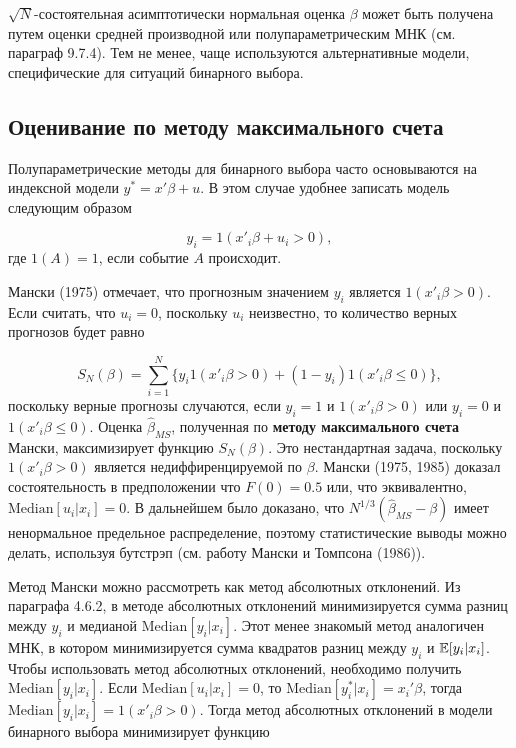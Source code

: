 $\sqrt{N}$-состоятельная асимптотически нормальная оценка $\beta$ может быть получена путем оценки средней производной  или полупараметрическим МНК (см. параграф 9.7.4). Тем не менее,  чаще используются альтернативные модели,  специфические для ситуаций бинарного выбора.

\subsection{Оценивание по методу максимального счета}

Полупараметрические методы для бинарного выбора часто основываются на индексной модели $y^*=x'\beta + u$. В этом случае удобнее записать модель следующим образом 

\[
y_i = 1(x'_i\beta + u_i > 0), 
\] 
где $1(A)=1$,  если событие $A$ происходит.

Мански  (1975)  отмечает,  что прогнозным значением $y_i$ является $1(x'_i\beta >0)$. Если считать, что $u_i=0$,  поскольку $u_i$ неизвестно,  то количество  верных прогнозов будет равно

\begin{equation} 
\label{GrindEQ__14_29_} 
S_N(\beta)=\sum^N_{i=1} \{y_i 1(x'_i\beta > 0) + (1-y_i) 1(x'_i\beta \le 0)\},  
\end{equation} 
поскольку верные прогнозы случаются, если $y_i=1$ и $1(x'_i\beta >0)$ или $y_i=0$ и $1(x'_i\beta \le 0).$ Оценка $\widehat\beta_{MS}$, полученная по \textbf{методу максимального счета} Мански,  максимизирует функцию $S_N(\beta)$. Это нестандартная задача,  поскольку $1(x'_i\beta > 0)$ является недиффиренцируемой по $\beta.$ Мански (1975,  1985) доказал состоятельность в предположении что $F(0) = 0.5$ или,  что эквивалентно,  $\mathrm{Median}[u_i|x_i]=0.$ В дальнейшем было доказано,  что $N^{1/3}(\widehat\beta_{MS} - \beta)$ имеет ненормальное предельное распределение,  поэтому статистические выводы можно делать,  используя бутстрэп (см. работу Мански и Томпсона (1986)).

Метод Мански можно рассмотреть как метод абсолютных отклонений. Из параграфа 4.6.2,  в методе абсолютных отклонений минимизируется сумма разниц между $y_i$ и медианой $\mathrm{Median}[y_i|x_i]$. Этот менее знакомый метод аналогичен МНК,  в котором минимизируется сумма квадратов разниц между $y_i$ и $\mathbb{E}[y_i|x_i]$. %
Чтобы использовать метод абсолютных отклонений,  необходимо получить $\mathrm{Median}[y_i|x_i]$. Если $\mathrm{Median}[u_i|x_i] = 0$,  то $\mathrm{Median}[y^*_i|x_i] = x_i'\beta$, тогда $\mathrm{Median}[y_i|x_i] = 1(x'_i\beta > 0).$ Тогда метод абсолютных отклонений в модели бинарного выбора минимизирует функцию 

